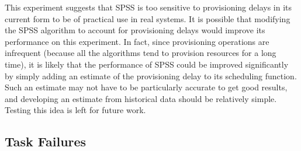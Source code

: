\documentclass[conference]{IEEEtran}
\begin{document}


This experiment suggests that SPSS is too sensitive to provisioning delays
in its current form to be of practical use in real systems. It is possible
that modifying the SPSS algorithm to account for provisioning delays would
improve its performance on this experiment. In fact, since provisioning
operations are infrequent (because all the algorithms tend to provision
resources for a long time), it is likely that the performance of SPSS could be
improved significantly by simply adding an estimate of the provisioning delay
to its scheduling function. Such an estimate may not have to be particularly
accurate to get good results, and developing an estimate from historical data
should be relatively simple. Testing this idea is left for future work.


\subsection{Task Failures}
\label{sec:failures}
\end{document}
